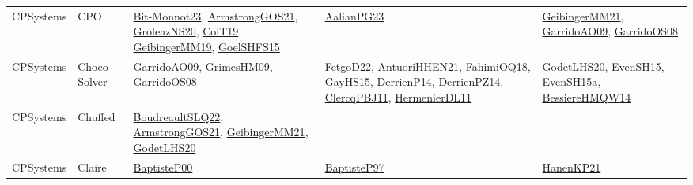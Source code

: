 {\begin{longtable}{lp{3cm}>{\raggedright}p{6cm}>{\raggedright}p{6cm}p{8cm}}
CPSystems & CPO & \href{papers/Bit-Monnot23.pdf}{Bit-Monnot23}\cite{Bit-Monnot23}, \href{papers/ArmstrongGOS21.pdf}{ArmstrongGOS21}\cite{ArmstrongGOS21}, \href{papers/GroleazNS20.pdf}{GroleazNS20}\cite{GroleazNS20}, \href{papers/ColT19.pdf}{ColT19}\cite{ColT19}, \href{papers/GeibingerMM19.pdf}{GeibingerMM19}\cite{GeibingerMM19}, \href{articles/GoelSHFS15.pdf}{GoelSHFS15}\cite{GoelSHFS15} & \href{papers/AalianPG23.pdf}{AalianPG23}\cite{AalianPG23} & \href{papers/GeibingerMM21.pdf}{GeibingerMM21}\cite{GeibingerMM21}, \href{articles/GarridoAO09.pdf}{GarridoAO09}\cite{GarridoAO09}, \href{articles/GarridoOS08.pdf}{GarridoOS08}\cite{GarridoOS08}\\
CPSystems & Choco Solver & \href{articles/GarridoAO09.pdf}{GarridoAO09}\cite{GarridoAO09}, \href{papers/GrimesHM09.pdf}{GrimesHM09}\cite{GrimesHM09}, \href{articles/GarridoOS08.pdf}{GarridoOS08}\cite{GarridoOS08} & \href{articles/FetgoD22.pdf}{FetgoD22}\cite{FetgoD22}, \href{papers/AntuoriHHEN21.pdf}{AntuoriHHEN21}\cite{AntuoriHHEN21}, \href{articles/FahimiOQ18.pdf}{FahimiOQ18}\cite{FahimiOQ18}, \href{papers/GayHS15.pdf}{GayHS15}\cite{GayHS15}, \href{papers/DerrienP14.pdf}{DerrienP14}\cite{DerrienP14}, \href{papers/DerrienPZ14.pdf}{DerrienPZ14}\cite{DerrienPZ14}, \href{papers/ClercqPBJ11.pdf}{ClercqPBJ11}\cite{ClercqPBJ11}, \href{papers/HermenierDL11.pdf}{HermenierDL11}\cite{HermenierDL11} & \href{papers/GodetLHS20.pdf}{GodetLHS20}\cite{GodetLHS20}, \href{papers/EvenSH15.pdf}{EvenSH15}\cite{EvenSH15}, \href{articles/EvenSH15a.pdf}{EvenSH15a}\cite{EvenSH15a}, \href{papers/BessiereHMQW14.pdf}{BessiereHMQW14}\cite{BessiereHMQW14}\\
CPSystems & Chuffed & \href{papers/BoudreaultSLQ22.pdf}{BoudreaultSLQ22}\cite{BoudreaultSLQ22}, \href{papers/ArmstrongGOS21.pdf}{ArmstrongGOS21}\cite{ArmstrongGOS21}, \href{papers/GeibingerMM21.pdf}{GeibingerMM21}\cite{GeibingerMM21}, \href{papers/GodetLHS20.pdf}{GodetLHS20}\cite{GodetLHS20} &  & \\
CPSystems & Claire & \href{articles/BaptisteP00.pdf}{BaptisteP00}\cite{BaptisteP00} & \href{papers/BaptisteP97.pdf}{BaptisteP97}\cite{BaptisteP97} & \href{papers/HanenKP21.pdf}{HanenKP21}\cite{HanenKP21}\\

\end{longtable}}
